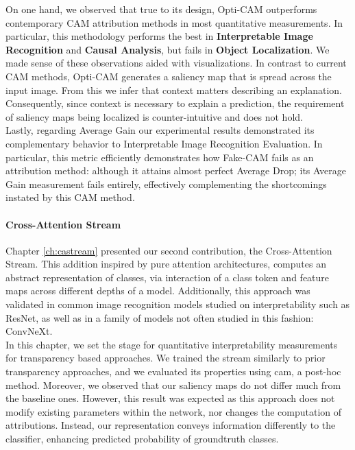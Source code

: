 \noindent On one hand, we observed that true to its design, Opti-CAM outperforms contemporary 
CAM attribution methods in most quantitative measurements. In particular, this methodology 
performs the best in \textbf{Interpretable Image Recognition} and \textbf{Causal Analysis}, but 
fails in \textbf{Object Localization}. We made sense of these observations aided with 
visualizations. In contrast to current CAM methods, Opti-CAM generates a saliency map that is 
spread across the input image. From this we infer that context matters describing an explanation. 
Consequently, since context is necessary to explain a prediction, the requirement of saliency maps 
being localized is counter-intuitive and does not hold.\\

\noindent Lastly, regarding Average Gain our experimental results demonstrated its complementary 
behavior to Interpretable Image Recognition Evaluation.  In particular, this metric efficiently 
demonstrates how Fake-CAM fails as an attribution method: although it attains almost perfect 
Average Drop; its Average Gain measurement fails entirely, effectively complementing the 
shortcomings instated by this CAM method.\\

\paragraph{Cross-Attention Stream}
\label{sub:conc_ca}
\noindent Chapter \ref{ch:castream} presented our second contribution, the Cross-Attention Stream. 
This addition inspired by pure attention architectures, computes an abstract representation of 
classes, via interaction of a class token and feature maps across different depths of a model. 
Additionally, this approach was validated in common image recognition models studied on 
interpretability such as ResNet, as well as in a family of models not often studied in this fashion: 
ConvNeXt.\\

\noindent In this chapter, we set the stage for quantitative interpretability measurements for 
transparency based approaches. We trained the stream similarly to prior transparency approaches, 
and we evaluated its properties using \gls{cam}, a post-hoc method. Moreover, we observed that our 
saliency maps do not differ much from the baseline ones. However, this result was expected as this 
approach does not modify existing parameters within the network, nor changes the computation of 
attributions. Instead, our representation conveys information differently to the classifier, 
enhancing predicted probability of groundtruth classes. \\

